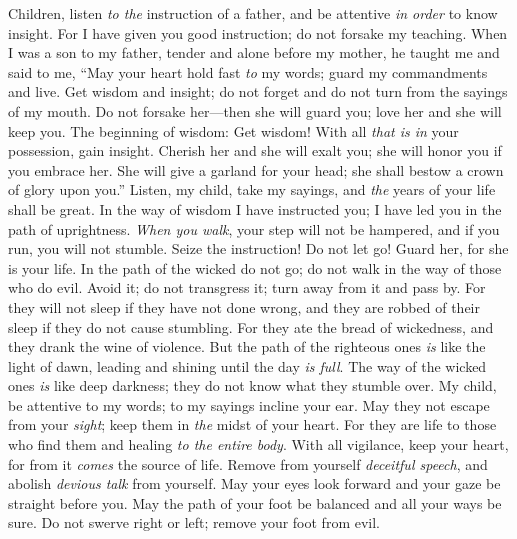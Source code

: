\begin{biblechapter} %
 Children, listen \textit{to the} instruction of a father, 
and be attentive \textit{in order} to know insight.
\verse For I have given you good instruction; 
do not forsake my teaching.
\verse When I was a son to my father, 
tender and alone before my mother,
\verse he taught me and said to me, 
“May your heart hold fast \textit{to} my words; 
guard my commandments and live.
\verse Get wisdom and insight; 
do not forget and do not turn from the sayings of my mouth.
\verse Do not forsake her—then she will guard you; 
love her and she will keep you.
\verse The beginning of wisdom: Get wisdom! 
With all \textit{that is in} your possession, gain insight.
\verse Cherish her and she will exalt you; 
she will honor you if you embrace her.
\verse She will give a garland for your head; 
she shall bestow a crown of glory upon you.”
 Listen, my child, take my sayings, 
and \textit{the} years of your life shall be great.
\verse In the way of wisdom I have instructed you; 
I have led you in the path of uprightness.
\verse \textit{When you walk}, your step will not be hampered, 
and if you run, you will not stumble.
\verse Seize the instruction! Do not let go! 
Guard her, for she is your life.
\verse In the path of the wicked do not go; 
do not walk in the way of those who do evil.
\verse Avoid it; do not transgress it; 
turn away from it and pass by.
\verse For they will not sleep if they have not done wrong, 
and they are robbed of their sleep if they do not cause stumbling.
\verse For they ate the bread of wickedness, 
and they drank the wine of violence.
\verse But the path of the righteous ones \textit{is} like the light of dawn, 
leading and shining until the day \textit{is full}.
\verse The way of the wicked ones \textit{is} like deep darkness; 
they do not know what they stumble over.
 My child, be attentive to my words; 
to my sayings incline your ear.
\verse May they not escape from your \textit{sight}; 
keep them in \textit{the} midst of your heart.
\verse For they are life to those who find them 
and healing \textit{to the entire body}.
\verse With all vigilance, keep your heart, 
for from it \textit{comes} the source of life.
\verse Remove from yourself \textit{deceitful speech}, 
and abolish \textit{devious talk} from yourself.
\verse May your eyes look forward 
and your gaze be straight before you.
\verse May the path of your foot be balanced 
and all your ways be sure.
\verse Do not swerve right or left; 
remove your foot from evil.
\end{biblechapter}

